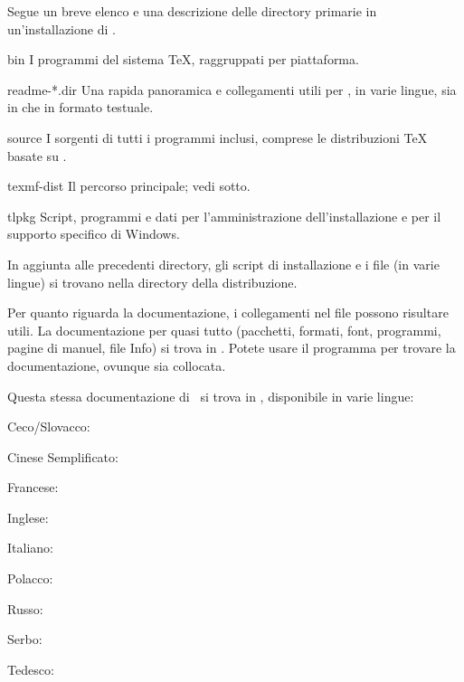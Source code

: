 \documentclass{article}
\begin{document}
Segue un breve elenco e una descrizione delle directory primarie in
un'installazione di \TL.

\begin{ttdescription}
\item[bin] I programmi del sistema \TeX{}, raggruppati per piattaforma.
%
\item[readme-*.dir] Una rapida panoramica e collegamenti utili per \TL{},
  in varie lingue, sia in \HTML{} che in formato testuale.
%
\item[source] I sorgenti di tutti i programmi inclusi, comprese le
  distribuzioni \TeX{} basate su \Webc{}.
%
\item[texmf-dist] Il percorso principale; vedi  sotto.
%
\item[tlpkg] Script, programmi e dati per l'amministrazione
  dell'installazione e per il supporto specifico di Windows.
\end{ttdescription}

In aggiunta alle precedenti directory, gli script di installazione e i
file  (in varie lingue) si trovano nella directory della
distribuzione.

Per quanto riguarda la documentazione, i collegamenti nel file
 possono risultare utili. La documentazione per quasi
tutto (pacchetti, formati, font, programmi, pagine di manuel, file Info)
si trova in . Potete usare il programma
 per trovare la documentazione, ovunque sia
collocata.

Questa stessa documentazione di \TL\ si trova in
, disponibile in varie lingue:

\begin{itemize*}
\item{Ceco/Slovacco:} 
\item{Cinese Semplificato:} 
\item{Francese:} 
\item{Inglese:} 
\item{Italiano:} 
\item{Polacco:} 
\item{Russo:} 
\item{Serbo:} 
\item{Tedesco:} 
\end{itemize*}
\end{document}
